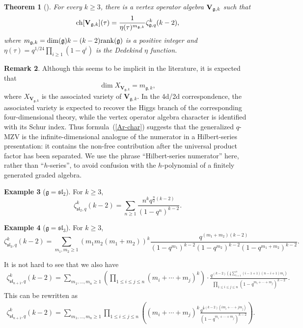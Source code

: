 \documentclass[pdftex]{sigma}
\numberwithin{equation}{section}
\newtheorem{Theorem}{Theorem}[section]
\theoremstyle{definition}
\newtheorem{Example}[Theorem]{Example}
\newtheorem{Remark}[Theorem]{Remark}
\begin{document}
\begin{Theorem}[\cite{Arakawa}] For every $k \geq 3$, there is a vertex operator algebra ${\bf V}_{\mathfrak{g},k}$ such that
\begin{equation} \label{Ar-char}
{\rm ch}[{\bf V}_{\mathfrak{g},k}](\tau)=\frac{1}{\eta(\tau)^{m_{\mathfrak{g},k}}} \zeta_{\mathfrak{g},q}^{k}(k-2),
\end{equation}
where $m_{\mathfrak{g},k}=\dim (\mathfrak{g})k-(k-2){\rm rank}(\mathfrak{g})$ is a positive integer and $\eta(\tau)=q^{1/24}\prod_{i \geq 1}(1-q^i)$ is the Dedekind $\eta$ function.
\end{Theorem}

\begin{Remark}
Although this seems to be implicit in the literature, it is expected that
\[
\dim X_{\mathbf V_{\mathfrak g,k}}=m_{\mathfrak g,k},
\]
where $X_{\mathbf V_{\mathfrak g,k}}$ is the associated variety of $\mathbf V_{\mathfrak g,k}$. In the 4d/2d correspondence, the associated variety is expected to recover the Higgs branch of the corresponding four-dimensional theory, while the vertex operator algebra character is identified with its Schur index. Thus formula~(\ref{Ar-char}) suggests that the generalized $q$-MZV is the infinite-dimensional analogue of the numerator in a Hilbert-series presentation: it contains the non-free contribution after the universal product factor has been separated. We use the phrase ``Hilbert-series numerator'' here, rather than ``$h$-series'', to avoid confusion with the $h$-polynomial of a finitely generated graded algebra.
\end{Remark}

\begin{Example}[$\mathfrak{g}=\mathfrak{sl}_2$] For $k \geq 3$,
\[
\zeta_{\mathfrak{sl}_2,q}^k(k-2)=\sum_{n \geq 1} \frac{n^k q^{\frac{n}{2} (k-2)} }{(1-q^n)^{k-2}}.
\]
\end{Example}

\begin{Example}[$\mathfrak{g}=\mathfrak{sl}_3$] For $k \geq 3$,
\[
\zeta_{\mathfrak{sl}_3,q}^k(k-2)=\sum_{m_1,m_2 \geq 1} \left( m_1 m_2 (m_1+m_2) \right)^k \frac{q^{(m_1 +m_2)(k-2)}}{(1-q^{m_1})^{k-2} (1-q^{m_2})^{k-2}(1-q^{m_1+m_2})^{k-2}}.
\]
\end{Example}

It is not hard to see that we also have
\begin{align*} %
 \zeta_{\mathfrak{sl}_{n+1},q}^k(k-2)
 =\sum_{m_1,\dots,m_n \geq 1} \left( \prod_{1 \leq i \leq j \leq n} (m_i+\cdots + m_j)^k\right) \cdot \frac{q^{(k-2)( \frac12 \sum_{i=1}^n (i-1+1)(n-i+1)m_i)}}{\prod_{1 \leq i \leq j \leq n} (1-q^{m_i+\cdots + m_j})^{k-2}}.
\end{align*}
This can be rewritten as
\begin{align*} %
 \zeta_{\mathfrak{sl}_{n+1},q}^k(k-2) =\sum_{m_1,\dots,m_n \geq 1} \prod_{1 \leq i \leq j \leq n} \left( (m_i+\cdots + m_j)^k \frac{q^{\frac12(k-2)( i m_i+\cdots + j m_j)}}{(1-q^{m_i+\cdots + m_j})^{k-2}}\right).
\end{align*}
\end{document}
